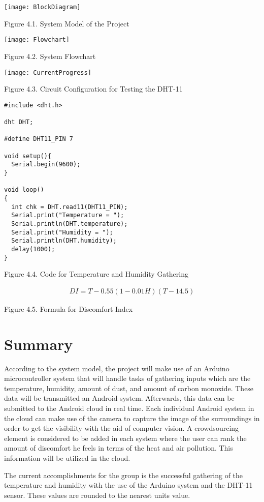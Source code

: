 \texttt{[image: BlockDiagram]}

\begin{center}
Figure 4.1. System Model of the Project
\end{center}

\begin{center}
\texttt{[image: Flowchart]}
\end{center}




\begin{center}
Figure 4.2. System Flowchart
\end{center}

\texttt{[image: CurrentProgress]}

\begin{center}
Figure 4.3. Circuit Configuration for Testing the DHT-11
\end{center}







\begin{lstlisting}
#include <dht.h>

dht DHT;

#define DHT11_PIN 7

void setup(){
  Serial.begin(9600);
}

void loop()
{
  int chk = DHT.read11(DHT11_PIN);
  Serial.print("Temperature = ");
  Serial.println(DHT.temperature);
  Serial.print("Humidity = ");
  Serial.println(DHT.humidity);
  delay(1000);
}
\end{lstlisting}

\begin{center}
Figure 4.4. Code for Temperature and Humidity Gathering
\end{center}
\begin{center}
\begin{eqnarray}
DI = T-0.55(1-0.01H)(T-14.5)
\label{Discomfort Index}
\end{eqnarray}
\end{center}
\begin{center}
Figure 4.5. Formula for Discomfort Index
\end{center}

\section{Summary}

According to the system model, the project will make use of an Arduino microcontroller system that will handle tasks of gathering inputs which are the temperature, humidity, amount of dust, and amount of carbon monoxide. These data will be transmitted an Android system. Afterwards, this data can be submitted  to the Android cloud in real time. Each individual Android system in the cloud can make use of the camera to capture the image of the surroundings in order to get the visibility with the aid of computer vision. A crowdsourcing element is considered to be added in each system where the user can rank the amount of discomfort he feels in terms of the heat and air pollution. This information will be utilized in the cloud.

The current accomplishments for the group is the successful gathering of the temperature and humidity with the use of the Arduino system and the DHT-11 sensor. These values are rounded to the nearest units value.